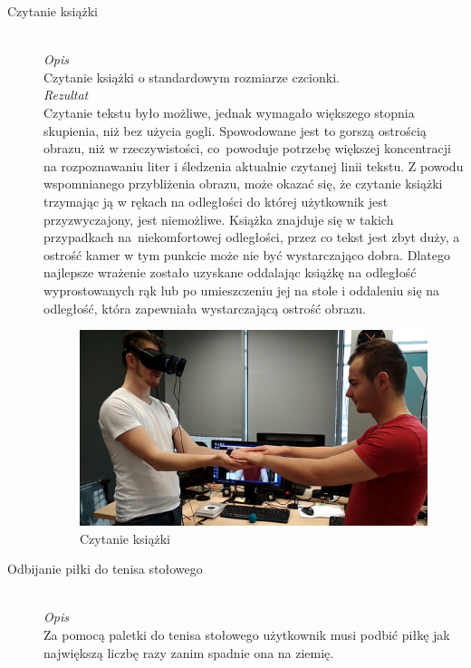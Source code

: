 \documentclass[a4paper,11pt,twoside]{report}
\theoremstyle{definition}
\begin{document}
\begin{description}
\item[Czytanie książki] \hfill \\
\textit{Opis} \\
Czytanie książki o standardowym rozmiarze czcionki. \\

\textit{Rezultat} \\
Czytanie tekstu było możliwe, jednak wymagało większego stopnia skupienia, niż bez użycia gogli. Spowodowane jest to gorszą ostrością obrazu, niż w rzeczywistości, co~powoduje potrzebę większej koncentracji na rozpoznawaniu liter i śledzenia aktualnie czytanej linii tekstu. Z powodu wspomnianego przybliżenia obrazu, może okazać się, że czytanie książki trzymając ją w rękach na odległości do której użytkownik jest przyzwyczajony, jest niemożliwe. Książka znajduje się w takich przypadkach na~niekomfortowej odległości, przez co tekst jest zbyt duży, a ostrość kamer w tym punkcie może nie być wystarczająco dobra. Dlatego najlepsze wrażenie zostało uzyskane oddalając książkę na odległość wyprostowanych rąk lub po umieszczeniu jej na stole i oddaleniu się na odległość, która zapewniała wystarczającą ostrość obrazu.    

\begin{figure}[H]
\centering
\includegraphics[scale=0.25]{images/lapkiTest}
\caption[ReadingTest]{Czytanie książki}
\end{figure}

\item[Odbijanie piłki do tenisa stołowego] \hfill \\
\textit{Opis} \\
 Za pomocą paletki do tenisa stołowego użytkownik musi podbić piłkę jak największą liczbę razy zanim spadnie ona na ziemię. \\
 

\end{description}
\end{document}
